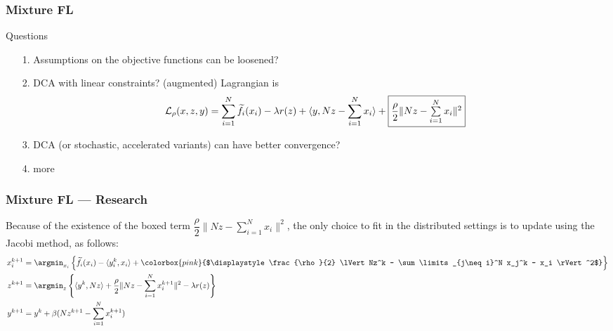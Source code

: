 \begin{frame}
\frametitle{Mixture FL}

\begin{block}{Questions}
\begin{itemize}
    \item[1.] Assumptions on the objective functions can be loosened?
    \item[2.] DCA with linear constraints? (augmented) Lagrangian is
    {\scriptsize
    $$\mathcal{L}_{\rho}(x,z,y) = \sum\limits_{i=1}^N \widetilde{f}_i(x_i) - \lambda r(z) + \langle y, Nz - \sum\limits_{i=1}^N x_i \rangle + \framebox{$\dfrac{\rho}{2} \lVert Nz - \sum\limits_{i=1}^N x_i \rVert^2$} $$
    }
    \item[3.] DCA (or stochastic, accelerated variants) can have better convergence?
    \item[4.] more
\end{itemize}
\end{block}

\end{frame}


\begin{frame}
\frametitle{Mixture FL --- Research}

Because of the existence of the boxed term $\dfrac{\rho}{2} \lVert Nz - \sum\limits_{i=1}^N x_i \rVert^2$, the only choice to fit in the distributed settings is to update using the Jacobi method, as follows:
{\footnotesize
\begin{align*}
    x_i^{k+1} & = \argmin_{x_i} \left\{ \widetilde{f}_i(x_i) - \langle y_i^k, x_i \rangle + \colorbox{pink}{$\displaystyle \frac{\rho}{2} \lVert Nz^k - \sum\limits_{j\neq i}^N x_j^k - x_i \rVert^2$} \right\} \\
    z^{k+1} & = \argmin_{z} \left\{ \langle y^k, Nz \rangle + \frac{\rho}{2} \lVert Nz - \sum\limits_{i=1}^N x_i^{k+1} \rVert^2 - \lambda r(z) \right\} \\
    y^{k+1} & = y^k + \beta (Nz^{k+1} - \sum\limits_{i=1}^N x_i^{k+1})
\end{align*}
}

\end{frame}



